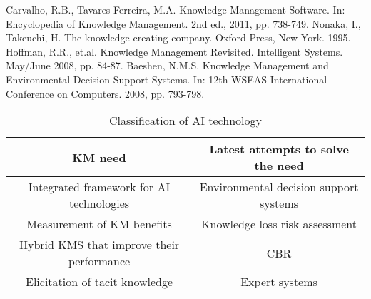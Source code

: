 \documentclass[a4paper,12pt,twocolumn]{article}
\begin{document}
\begin{thebibliography}{0}
	 Carvalho, R.B., Tavares Ferreira, M.A. Knowledge Management Software. In: Encyclopedia of Knowledge Management.  2nd ed., 2011, pp. 738-749. 
	     Nonaka, I., Takeuchi, H. The knowledge creating company. Oxford Press, New York. 1995. 
   Hoffman, R.R., et.al. Knowledge Management Revisited. Intelligent Systems. May/June 2008, pp. 84-87.
      Baeshen, N.M.S. Knowledge Management and Environmental Decision Support Systems. In: 12th WSEAS International Conference on Computers. 2008, pp. 793-798. 
\end{thebibliography}
\onecolumn
\begin{table}[!hbp]
	\centering 
	\caption{Classification of AI technology}\label{table1}
	\begin{tabular}{|c|c|}
		\hline
		KM need & Latest attempts to solve the need  \\
		\hline
		Integrated framework for AI technologies  & Environmental decision support systems\cite{Baeshen.{2008}} \\
		\hline
		Measurement of KM benefits & Knowledge loss risk assessment\cite{Hoffman.{2008}} \\
		\hline
		Hybrid KMS that improve their performance  & CBR\cite{Carvalho.{2011}} \\
		\hline
		Elicitation of tacit knowledge & Expert systems\cite{Nonaka.{1995}}\\
		\hline
	\end{tabular}
\end{table}
\end{document}
